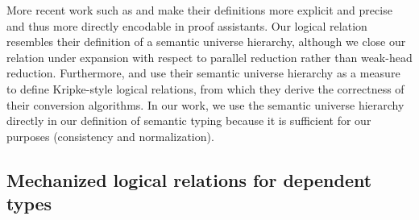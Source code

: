 \documentclass[acmsmall,screen=true,
\ifpublic review=false\else,review=true\fi
  ,anonymous=\ifanonymous true\else false\fi]{acmart}
\newcommand{\scw}[1]{}
\newcommand{\yl}[1]{}
\begin{document}
More recent work such as \citet{Abel12}
and \citet{abel2008betaeta} make their definitions more explicit and
precise and thus more directly encodable in proof assistants.
Our logical relation resembles their definition of a
semantic universe hierarchy, although we close our relation
under expansion with respect to parallel reduction rather
than weak-head reduction. \scw{Why is this important?} \yl{if you are
  referring to the sentence about weak-head reduction, it can
  be deleted because it's discussed in Section 9 already}
Furthermore, \citet{Abel12} and
\citet{abel2008betaeta} use their semantic universe hierarchy as a
measure to define Kripke-style logical relations, from which they
derive the correctness of their conversion algorithms. In our work, we
use the semantic universe hierarchy directly in our definition of
semantic typing because it is sufficient for our purposes
(consistency and normalization).

\subsection{Mechanized logical relations for dependent types}

\newcommand\header[1]{\rotatebox{60}{{#1}}}
\end{document}
